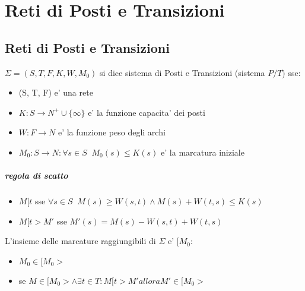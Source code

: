 \chapter{Reti di Posti e Transizioni}

\section{Reti di Posti e Transizioni}

$\Sigma  = (S, T, F, K, W, M_0)$ si dice sistema di Posti e Transizioni (sistema $P/T$) sse:
\begin{itemize}
    \item (S, T, F) e' una rete
    \item $K : S \rightarrow N^+ \cup \{\infty\}$ e' la funzione capacita' dei posti
    \item $W : F \rightarrow N$ e' la funzione peso degli archi
    \item $M_0 : S \rightarrow N : \forall s \in S \;\; M_0(s) \leq K(s)$ e' la marcatura iniziale
\end{itemize}

\paragraph{regola di scatto}

\begin{itemize}
    \item $M[t$ sse $\forall s \in S \;\; M(s) \geq W(s, t) \land M(s) + W(t, s) \leq K(s)$
    \item $M[t > M'$ sse $M'(s) = M(s) - W(s, t) + W(t, s)$
\end{itemize}

L'insieme delle marcature raggiungibili di $\Sigma$ e' $[M_0$:
\begin{itemize}
    \item $M_0 \in [M_0 >$
    \item se $M \in [M_0 > \land \exists t \in T : M[t > M' allora M' \in [M_0 >$
\end{itemize}
